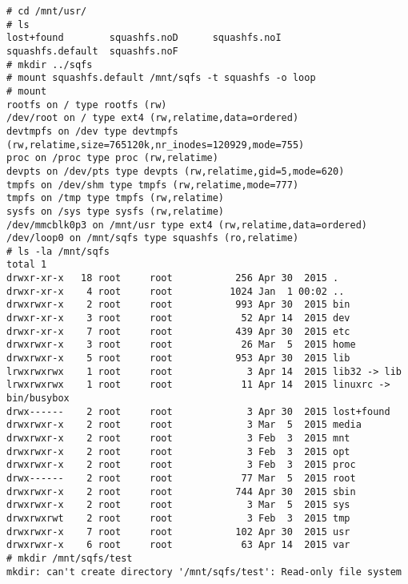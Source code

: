 \begin{lstlisting}[style=Bash]
# cd /mnt/usr/
# ls
lost+found        squashfs.noD      squashfs.noI
squashfs.default  squashfs.noF
# mkdir ../sqfs
# mount squashfs.default /mnt/sqfs -t squashfs -o loop
# mount
rootfs on / type rootfs (rw)
/dev/root on / type ext4 (rw,relatime,data=ordered)
devtmpfs on /dev type devtmpfs (rw,relatime,size=765120k,nr_inodes=120929,mode=755)
proc on /proc type proc (rw,relatime)
devpts on /dev/pts type devpts (rw,relatime,gid=5,mode=620)
tmpfs on /dev/shm type tmpfs (rw,relatime,mode=777)
tmpfs on /tmp type tmpfs (rw,relatime)
sysfs on /sys type sysfs (rw,relatime)
/dev/mmcblk0p3 on /mnt/usr type ext4 (rw,relatime,data=ordered)
/dev/loop0 on /mnt/sqfs type squashfs (ro,relatime)
# ls -la /mnt/sqfs
total 1
drwxr-xr-x   18 root     root           256 Apr 30  2015 .
drwxr-xr-x    4 root     root          1024 Jan  1 00:02 ..
drwxrwxr-x    2 root     root           993 Apr 30  2015 bin
drwxr-xr-x    3 root     root            52 Apr 14  2015 dev
drwxr-xr-x    7 root     root           439 Apr 30  2015 etc
drwxrwxr-x    3 root     root            26 Mar  5  2015 home
drwxrwxr-x    5 root     root           953 Apr 30  2015 lib
lrwxrwxrwx    1 root     root             3 Apr 14  2015 lib32 -> lib
lrwxrwxrwx    1 root     root            11 Apr 14  2015 linuxrc -> bin/busybox
drwx------    2 root     root             3 Apr 30  2015 lost+found
drwxrwxr-x    2 root     root             3 Mar  5  2015 media
drwxrwxr-x    2 root     root             3 Feb  3  2015 mnt
drwxrwxr-x    2 root     root             3 Feb  3  2015 opt
drwxrwxr-x    2 root     root             3 Feb  3  2015 proc
drwx------    2 root     root            77 Mar  5  2015 root
drwxrwxr-x    2 root     root           744 Apr 30  2015 sbin
drwxrwxr-x    2 root     root             3 Mar  5  2015 sys
drwxrwxrwt    2 root     root             3 Feb  3  2015 tmp
drwxrwxr-x    7 root     root           102 Apr 30  2015 usr
drwxrwxr-x    6 root     root            63 Apr 14  2015 var
# mkdir /mnt/sqfs/test
mkdir: can't create directory '/mnt/sqfs/test': Read-only file system
\end{lstlisting}

